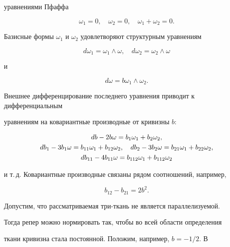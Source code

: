 уравнениями Пфаффа 


\begin{equation} 


\omega_1=0,\quad \omega_2=0,\quad \omega_1+\omega_2=0. 


\end{equation} 


Базисные формы $\omega_1$ и $\omega_2$ удовлетворяют структурным уравнениям 


\begin{equation} 


d\omega_1=\omega_1\wedge\omega,\quad d\omega_2=\omega_2\wedge\omega 


\end{equation} 


и 


\begin{equation} 


d\omega=b\omega_1\wedge\omega_2. 


\end{equation} 


Внешнее дифференцирование последнего уравнения приводит к дифференциальным 


уравнениям на ковариантные производные от кривизны $b$: 


\begin{gather} 


db-2b\omega=b_1\omega_1+b_2\omega_2,\notag\\ 


db_1-3b_1\omega=b_{11}\omega_1+b_{12}\omega_2,\quad 


db_2-3b_2\omega=b_{21}\omega_1+b_{22}\omega_2,\\ 


db_{11}-4b_{11}\omega=b_{112}\omega_1+b_{112}\omega_2\notag 


\end{gather} 


и т.\,д. Ковариантные производные связаны рядом соотношений, например, 


$$ 


b_{12}-b_{21}=2b^2. 


$$ 


 


Допустим, что рассматриваемая три-ткань не является параллелизуемой. 


Тогда репер можно нормировать так, чтобы во всей области определения 


ткани кривизна стала постоянной. Положим, например, $b=-1/2$. В 



